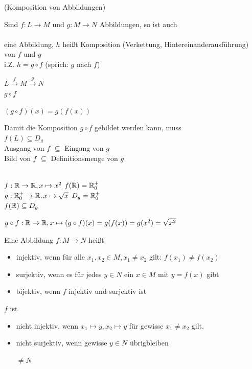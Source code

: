 \Def (Komposition von Abbildungen)

Sind $f:L\to M$ und $g:M\to N$ Abbildungen, so ist auch\\
\\
eine Abbildung, $h$ heißt Komposition (Verkettung, Hintereinanderausführung) von $f$ und $g$\\
i.Z. $h=g\circ f$ (sprich: {\flqq $g$ nach $f$\frqq})

$L\stackrel{f}{\to}M\stackrel{g}{\to}N$\\
$g\circ f$

$(g\circ f)(x) = g(f(x))$

\Bem Damit die Komposition $g\circ f$ gebildet werden kann, muss\\
$f(L)\subseteq D_g$\\
Ausgang von $f$ $\subseteq$ Eingang von $g$\\
Bild von $f$ $\subseteq$ Definitionsmenge von $g$

\Bsp
\ \\
$f:\mathbb{R}\to\mathbb{R}, x\mapsto x^2$ \qquad $f(\mathbb{R}) = \mathbb{R}_0^+$\\
$g:\mathbb{R}_0^+\to\mathbb{R}, x\mapsto \sqrt{x}$ \qquad $D_g=\mathbb{R}_0^+$\\
$f(\mathbb{R})\subseteq D_g$

$g\circ f: \mathbb{R}\to\mathbb{R}, x\mapsto (g\circ f)(x)=g(f(x))=g(x^2)=\sqrt{x^2}$

\Def Eine Abbildung $f:M\to N$ heißt
\begin{itemize}
	\item injektiv, wenn für alle $x_1,x_2\in M, x_1\ne x_2$ gilt: $f(x_1)\ne f(x_2)$
	\item surjektiv, wenn es für jedes $y\in N$ ein $x\in M$ mit $y=f(x)$ gibt
	\item bijektiv, wenn $f$ injektiv und surjektiv ist
\end{itemize}

\Bem $f$ ist

\begin{itemize}
	\item nicht injektiv, wenn $x_1\mapsto y, x_2\mapsto y$
	für gewisse $x_1\ne x_2$ gilt.
	
	\item nicht surjektiv, wenn gewisse $y\in N$ {\flqq übrigbleiben\frqq}
	
	
	$\ne N$
\end{itemize}

\clearpage
\Bsps

